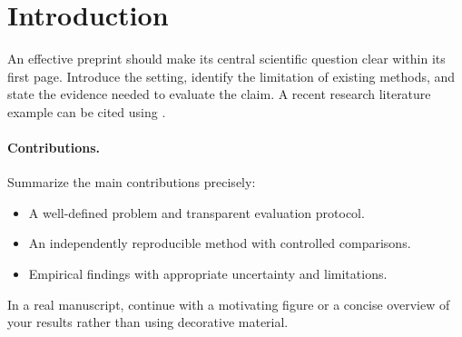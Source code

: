 \section{Introduction}\label{sec:intro}
An effective preprint should make its central scientific question clear within
its first page. Introduce the setting, identify the limitation of existing
methods, and state the evidence needed to evaluate the claim. A recent research
literature example can be cited using \citet{vaswani2017attention}.

\paragraph{Contributions.} Summarize the main contributions precisely:
\begin{itemize}
  \item A well-defined problem and transparent evaluation protocol.
  \item An independently reproducible method with controlled comparisons.
  \item Empirical findings with appropriate uncertainty and limitations.
\end{itemize}

In a real manuscript, continue with a motivating figure or a concise overview
of your results rather than using decorative material.
